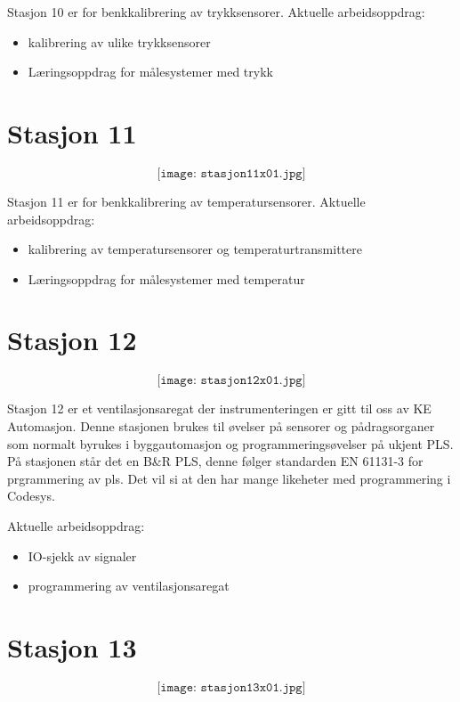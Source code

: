 Stasjon 10 er for benkkalibrering av trykksensorer. 
Aktuelle arbeidsoppdrag:\\
\begin{itemize}[noitemsep]
	\item kalibrering av ulike trykksensorer
	\item Læringsoppdrag for målesystemer med trykk
\end{itemize}
\section{Stasjon 11}

$$\texttt{[image: stasjon11x01.jpg]}$$

Stasjon 11 er for benkkalibrering av temperatursensorer. 
Aktuelle arbeidsoppdrag:\\
\begin{itemize}[noitemsep]
	\item kalibrering av temperatursensorer og temperaturtransmittere
	\item Læringsoppdrag for målesystemer med temperatur
\end{itemize}

\section{Stasjon 12}

$$\texttt{[image: stasjon12x01.jpg]}$$

Stasjon 12 er et ventilasjonsaregat der instrumenteringen er gitt til oss av KE Automasjon. Denne stasjonen brukes til øvelser på sensorer og pådragsorganer som normalt byrukes i byggautomasjon og programmeringsøvelser på ukjent PLS. På stasjonen står det en B\&R PLS, denne følger standarden EN 61131-3 for prgrammering av pls. Det vil si at den har mange likeheter med programmering i Codesys. 

Aktuelle arbeidsoppdrag:\\
\begin{itemize}[noitemsep]
	\item IO-sjekk av signaler
	\item programmering av ventilasjonsaregat
\end{itemize}
\section{Stasjon 13}

$$\texttt{[image: stasjon13x01.jpg]}$$

